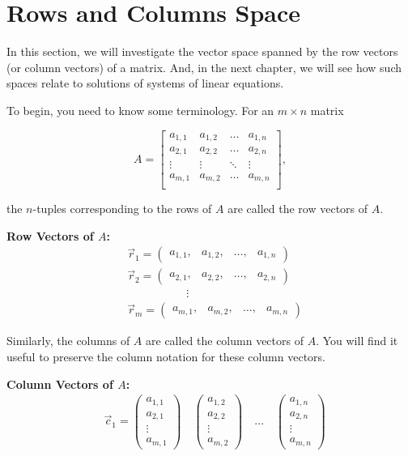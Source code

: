 \section{Rows and Columns Space}

In this section, we will investigate the vector space spanned by the row vectors (or column vectors) of a matrix. And, in the next chapter, we will see how such spaces relate to solutions of systems of linear equations.

To begin, you need to know some terminology. For an $m \times n$ matrix 

\[
A = \begin{bmatrix}
a_{1,1} & a_{1,2} & \dots & a_{1,n} \\
a_{2,1} & a_{2,2} & \dots & a_{2,n} \\
\vdots & \vdots & \ddots & \vdots \\
a_{m,1} & a_{m,2} & \dots & a_{m,n} \\
\end{bmatrix},
\]

the $n$-tuples corresponding to the rows of $A$ are called the row vectors of $A$.


\textbf{Row Vectors of $A$:}
\[
\begin{aligned}
& \vec r_1 = \begin{pmatrix} a_{1,1}, & a_{1,2}, & \dots, & a_{1,n} \end{pmatrix} \\
& \vec r_2 = \begin{pmatrix} a_{2,1}, & a_{2,2}, & \dots, & a_{2,n} \end{pmatrix} \\
&  \ \quad \quad \quad \quad \quad \vdots \\
& \vec r_m = \begin{pmatrix} a_{m,1}, & a_{m,2}, & \dots, & a_{m,n} \end{pmatrix}
\end{aligned}
\]

Similarly, the columns of $A$ are called the column vectors of $A$. You will find it useful to preserve the column notation for these column vectors.

\textbf{Column Vectors of $A$:}
\[
\begin{aligned}
& \vec c_1 = \begin{pmatrix} a_{1,1} \\ a_{2,1} \\ \vdots \\ a_{m,1} \end{pmatrix} \quad
\begin{pmatrix} a_{1,2} \\ a_{2,2} \\ \vdots \\ a_{m,2} \end{pmatrix} \quad
\dots \quad
\begin{pmatrix} a_{1,n} \\ a_{2,n} \\ \vdots \\ a_{m,n} \end{pmatrix}
\end{aligned}
\]

